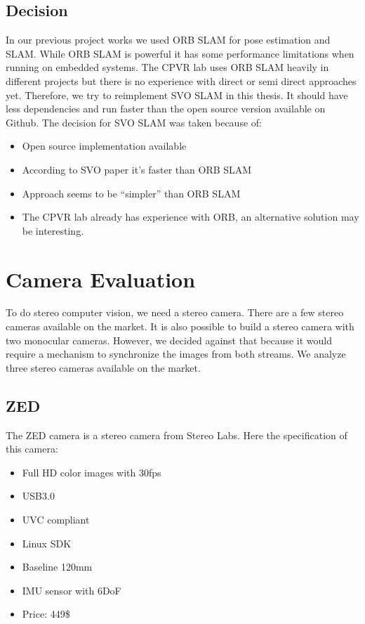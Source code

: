 \documentclass[11pt,a4paper,titlepage,oneside]{report}
\begin{document}
\section{Decision}

In our previous project works we used ORB SLAM for pose estimation and SLAM. While ORB SLAM is powerful it has some performance limitations when running on embedded systems. The CPVR lab uses ORB SLAM heavily in different projects but there is no experience with direct or semi direct approaches yet. Therefore, we try to reimplement SVO SLAM in this thesis. It should have less dependencies and run faster than the open source version available on Github. The decision for SVO SLAM was taken because of:
\begin{itemize}
  \item Open source implementation available
  \item According to SVO paper it's faster than ORB SLAM
  \item Approach seems to be ``simpler'' than ORB SLAM
  \item The CPVR lab already has experience with ORB, an alternative solution may be interesting.
\end{itemize}

\chapter{Camera Evaluation}

To do stereo computer vision, we need a stereo camera. There are a few stereo cameras available on the market. It is also possible to build a stereo camera with two monocular cameras. However, we decided against that because it would require a mechanism to synchronize the images from both streams. We analyze three stereo cameras available on the market.

\section{ZED}
The ZED camera \cite{zed} is a stereo camera from Stereo Labs. Here the specification of this camera:
\begin{itemize}
  \item Full HD color images with 30fps
  \item USB3.0
  \item UVC compliant
  \item Linux SDK
  \item Baseline 120mm
  \item IMU sensor with 6DoF
  \item Price: 449\$
\end{itemize}
\end{document}

